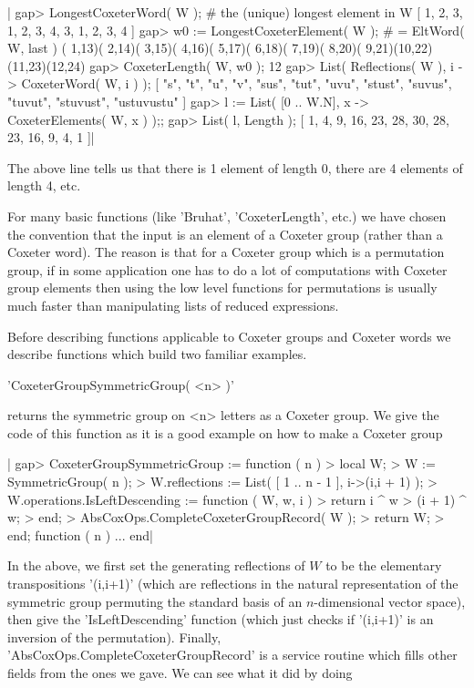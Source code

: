 |    gap> LongestCoxeterWord( W );  # the (unique) longest element in W
    [ 1, 2, 3, 1, 2, 3, 4, 3, 1, 2, 3, 4 ]
    gap> w0 := LongestCoxeterElement( W ); # = EltWord( W, last )
    ( 1,13)( 2,14)( 3,15)( 4,16)( 5,17)( 6,18)( 7,19)( 8,20)( 9,21)(10,22)
    (11,23)(12,24)
    gap> CoxeterLength( W, w0 );
    12
    gap> List( Reflections( W ), i -> CoxeterWord( W, i ) );
    [ "s", "t", "u", "v", "sus", "tut", "uvu", "stust", "suvus", "tuvut",
      "stuvust", "ustuvustu" ]
    gap> l := List( [0 .. W.N], x -> CoxeterElements( W, x ) );;
    gap> List( l, Length );
    [ 1, 4, 9, 16, 23, 28, 30, 28, 23, 16, 9, 4, 1 ]|

The above line tells us that there is 1 element of length 0, there are 4
elements of length 4, etc.

For  many basic  functions (like  'Bruhat', 'CoxeterLength',  etc.) we have
chosen  the convention  that the  input is  an element  of a  Coxeter group
(rather  than a Coxeter word). The reason is that for a Coxeter group which
is  a permutation  group, if  in some  application one  has to  do a lot of
computations  with Coxeter group  elements then using  the low level {\GAP}
functions  for permutations is usually  much faster than manipulating lists
of reduced expressions.

Before  describing functions  applicable to  Coxeter groups  and Coxeter
words we describe functions which  build two familiar examples.


'CoxeterGroupSymmetricGroup( <n> )'

returns the symmetric group on <n> letters as a Coxeter group.   We  give
the  code  of  this  function  as  it  is a good example on how to make a
Coxeter group\:

|    gap> CoxeterGroupSymmetricGroup := function ( n )
    > local  W;
    > W := SymmetricGroup( n );
    > W.reflections := List( [ 1 .. n - 1 ], i->(i,i + 1) );
    > W.operations.IsLeftDescending := function ( W, w, i )
    >       return i ^ w > (i + 1) ^ w;
    >   end;
    > AbsCoxOps.CompleteCoxeterGroupRecord( W );
    > return W;
    > end;
    function ( n ) ... end|

In   the   above,  we   first   set   the  generating   reflections   of
$W$   to  be   the  elementary   transpositions  '(i,i+1)'   (which  are
reflections  in  the  natural  representation  of  the  symmetric  group
permuting  the  standard  basis  of an  $n$-dimensional  vector  space),
then   give  the   'IsLeftDescending'   function   (which  just   checks
if   '(i,i+1)'   is  an   inversion   of   the  permutation).   Finally,
'AbsCoxOps.CompleteCoxeterGroupRecord' is a  service routine which fills
other fields from the ones we gave. We can see what it did by doing\:

